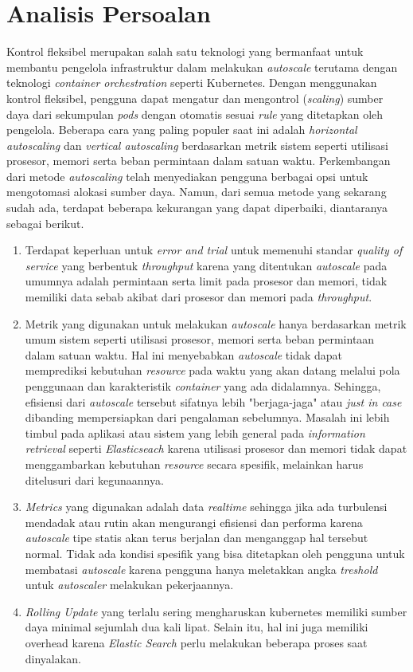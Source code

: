 \section{Analisis Persoalan}

Kontrol fleksibel merupakan salah satu teknologi yang bermanfaat untuk membantu pengelola infrastruktur dalam melakukan \textit{autoscale} terutama dengan teknologi \textit{container orchestration} seperti Kubernetes. Dengan menggunakan kontrol fleksibel, pengguna dapat mengatur dan mengontrol (\textit{scaling}) sumber daya dari sekumpulan \textit{pods} dengan otomatis sesuai \textit{rule} yang ditetapkan oleh pengelola. Beberapa cara yang paling populer saat ini adalah \textit{horizontal autoscaling} dan \textit{vertical autoscaling} berdasarkan metrik sistem seperti utilisasi prosesor, memori serta beban permintaan dalam satuan waktu. Perkembangan dari metode \textit{autoscaling} telah menyediakan pengguna berbagai opsi untuk mengotomasi alokasi sumber daya. Namun, dari semua metode yang sekarang sudah ada, terdapat beberapa kekurangan yang dapat diperbaiki, diantaranya sebagai berikut.

\begin{enumerate}
    \item Terdapat keperluan untuk \textit{error and trial} untuk memenuhi standar \textit{quality of service} yang berbentuk \textit{throughput} karena yang ditentukan \textit{autoscale} pada umumnya adalah permintaan serta limit pada prosesor dan memori, tidak memiliki data sebab akibat dari prosesor dan memori pada \textit{throughput}.
    \item Metrik yang digunakan untuk melakukan \textit{autoscale} hanya berdasarkan metrik umum sistem seperti utilisasi prosesor, memori serta beban permintaan dalam satuan waktu. Hal ini menyebabkan \textit{autoscale} tidak dapat memprediksi kebutuhan \textit{resource} pada waktu yang akan datang melalui pola penggunaan dan karakteristik \textit{container} yang ada didalamnya. Sehingga, efisiensi dari \textit{autoscale} tersebut sifatnya lebih "berjaga-jaga" atau \textit{just in case} dibanding mempersiapkan dari pengalaman sebelumnya. Masalah ini lebih timbul pada aplikasi atau sistem yang lebih general pada \textit{information retrieval} seperti \textit{Elasticseach} karena utilisasi prosesor dan memori tidak dapat menggambarkan kebutuhan \textit{resource} secara spesifik, melainkan harus ditelusuri dari kegunaannya.
    \item \textit{Metrics} yang digunakan adalah data \textit{realtime} sehingga jika ada turbulensi mendadak atau rutin akan mengurangi efisiensi dan performa karena \textit{autoscale} tipe statis akan terus berjalan dan menganggap hal tersebut normal. Tidak ada kondisi spesifik yang bisa ditetapkan oleh pengguna untuk membatasi \textit{autoscale} karena pengguna hanya meletakkan angka \textit{treshold} untuk \textit{autoscaler} melakukan pekerjaannya.
    \item \textit{Rolling Update} yang terlalu sering mengharuskan kubernetes memiliki sumber daya minimal sejumlah dua kali lipat. Selain itu, hal ini juga memiliki overhead karena \textit{Elastic Search} perlu melakukan beberapa proses saat dinyalakan.
\end{enumerate}

